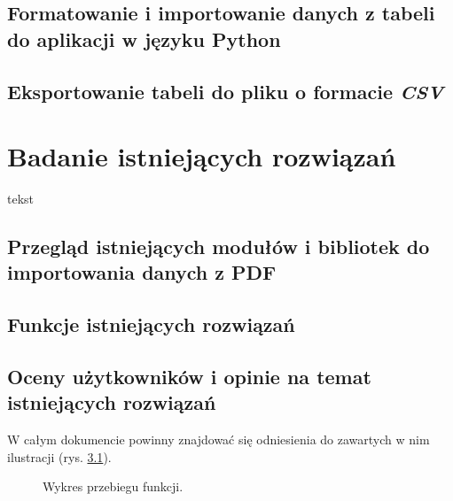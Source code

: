 \documentclass[a4paper,twoside,12pt]{book}
\begin{document}
\section{Formatowanie i importowanie danych z tabeli do aplikacji w języku Python}
\section{Eksportowanie tabeli do pliku o formacie \emph{CSV}}

\chapter{Badanie istniejących rozwiązań} 

tekst

\section{Przegląd istniejących modułów i bibliotek do importowania danych z PDF}

\section{Funkcje istniejących rozwiązań}

\section{Oceny użytkowników i opinie na temat istniejących rozwiązań}

W całym dokumencie powinny znajdować się odniesienia do zawartych w nim ilustracji (rys. \ref{fig:2}).

\begin{figure}
\centering
{}
\caption{Wykres przebiegu funkcji.} %
\label{fig:2}
\end{figure}
\end{document}
